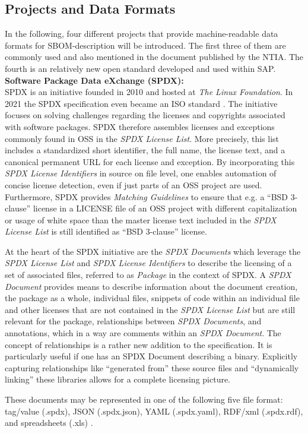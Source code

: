 \subsection{Projects and Data Formats}
In the following, four different projects that provide machine-readable data formats for SBOM-description will be introduced. The first three of them are commonly used and also mentioned in the document published by the NTIA. The fourth is an relatively new open standard developed and used within SAP.\\

\noindent   
\textbf{Software Package Data eXchange (SPDX):}\\
SPDX is an initiative founded in 2010 and hosted at \textit{The Linux Foundation}. In 2021 the SPDX specification even became an ISO standard \cite{SPDXISO}. The initiative focuses on solving challenges regarding the licenses and copyrights associated with software packages. SPDX therefore assembles licenses and exceptions commonly found in OSS in the \textit{SPDX License List}. More precisely, this list includes a standardized short identifier, the full name, the license text, and a canonical permanent URL for each license and exception. By incorporating this \textit{SPDX License Identifiers} in source on file level, one enables automation of concise license detection, even if just parts of an OSS project are used. Furthermore, SPDX provides \textit{Matching Guidelines} to ensure that e.g. a \enquote{BSD 3-clause} license in a LICENSE file of an OSS project with different capitalization or usage of white space than the master license text included in the \textit{SPDX License List} is still identified as \enquote{BSD 3-clause} license.\par
At the heart of the SPDX initiative are the \textit{SPDX Documents} which leverage the \textit{SPDX License List} and \textit{SPDX License Identifiers} to describe the licensing of a set of associated files, referred to as \textit{Package} in the context of SPDX. A \textit{SPDX Document} provides means to describe information about the document creation, the package as a whole, individual files, snippets of code within an individual file and other licenses that are not contained in the \textit{SPDX License List} but are still relevant for the package, relationships between \textit{SPDX Documents}, and annotations, which in a way are comments within an \textit{SPDX Document}. The concept of relationships is a rather new addition to the specification. It is particularly useful if one has an SPDX Document describing a binary. Explicitly capturing relationships like \enquote{generated from} these source files and \enquote{dynamically linking} these libraries allows for a complete licensing picture. \par
These documents may be represented in one of the following five file format: tag/value (.spdx), JSON (.spdx.json), YAML (.spdx.yaml), RDF/xml (.spdx.rdf), and spreadsheets (.xls) \cite{SPDXWebsite, SPDXSpec}.\\

